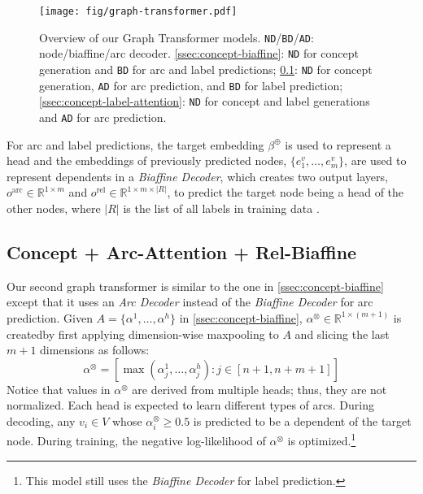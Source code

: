 \documentclass[11pt,a4paper]{article}
\newcommand{\LN}{\linebreak\noindent}    \newcommand{\textsec}[1]{\textsection\ref{#1}}
\begin{document}
\begin{figure}[htbp!]
\centering
\texttt{[image: fig/graph-transformer.pdf]}
\caption{Overview of our Graph Transformer models. \texttt{ND}/\texttt{BD}/\texttt{AD}: node/biaffine/arc decoder. \textsec{ssec:concept-biaffine}: \texttt{ND} for concept generation and \texttt{BD} for arc and label predictions; \textsec{ssec:concept-biaffine-attention}: \texttt{ND} for concept generation, \texttt{AD} for arc prediction, and \texttt{BD} for label prediction; \textsec{ssec:concept-label-attention}: \texttt{ND} for concept and label generations and \texttt{AD} for arc prediction.}
\label{fig:graph-transformer}
\end{figure}

\noindent For arc and label predictions, the target embedding $\beta^\oplus$ is used to represent a head and the embeddings of previously predicted nodes, $\{e^v_1, \ldots, e^v_m\}$, are used to represent dependents in a \textit{Biaffine Decoder}, which creates two output layers, $o^\text{arc} \in \mathbb{R}^{1 \times m} $ and $o^\text{rel} \in \mathbb{R}^{1 \times m \times |R|}$, to predict the target node being a head of the other nodes, where $|R|$ is the list of all labels in training data \cite{dozat:17a}.




\subsection{Concept + Arc-Attention + Rel-Biaffine}
\label{ssec:concept-biaffine-attention}

Our second graph transformer is similar to the one in \textsec{ssec:concept-biaffine} except that it uses an \textit{Arc Decoder} instead of the \textit{Biaffine Decoder} for arc prediction.
Given $A = \{\alpha^1, \ldots, \alpha^h\}$ in \textsec{ssec:concept-biaffine}, $\alpha^\otimes \in \mathbb{R}^{1 \times (m+1)}$ is created\LN by first applying dimension-wise maxpooling to $A$ and slicing the last $m+1$ dimensions as follows:
$$
\alpha^\otimes = [\max(\alpha^1_j, \ldots, \alpha^h_j) : j \in [n+1, n+m+1]]
$$
Notice that values in $\alpha^\otimes$ are derived from multiple heads; thus, they are not normalized.
Each head is expected to learn different types of arcs.
During decoding, any $v_i \in V$ whose $\alpha^\otimes_i \geq 0.5$ is predicted to be a dependent of the target node.
During training, the negative log-likelihood of $\alpha^\otimes$ is optimized.\footnote{This model still uses the \textit{Biaffine Decoder} for label prediction.}
\end{document}
